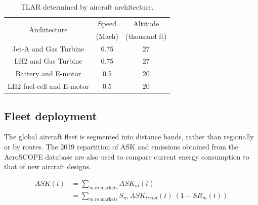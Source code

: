 \documentclass[
]{kaohandt}
\begin{document}
\begin{table}[h!]
    \caption{TLAR determined by aircraft architecture.}
    \centering
    \begin{tabular}{c|c c}
    \toprule
    \multirow{2}{*}{Architecture} & Speed & Altitude\\
    & (Mach) &  (thousand ft)\\
    \midrule
    Jet-A and Gas Turbine & 0.75 & 27 \\
    LH2 and Gas Turbine & 0.75 & 27 \\
    Battery and E-motor & 0.5 & 20 \\
    LH2 fuel-cell and E-motor & 0.5 & 20 \\

    \bottomrule
    \end{tabular}
    \label{tab:tlar-architecture}
\end{table}

\subsection{Fleet deployment}

The global aircraft fleet is segmented into distance bands, rather than regionally or by routes. The 2019 repartition of ASK and emissions obtained from the AeroSCOPE database  are also used to compare current energy consumption to that of new aircraft designs.



\begin{equation}
\label{eq:segmented-avoidance}
\begin{split}
    ASK(t) & = \sum_{m\ in\ \text{markets}} ASK_m(t)\\
    & =\sum_{m\ in\ \text{markets}} S_{m}\ ASK_{trend}(t)\ (1 - SR_{m} (t) )
\end{split}
\end{equation}
\end{document}
